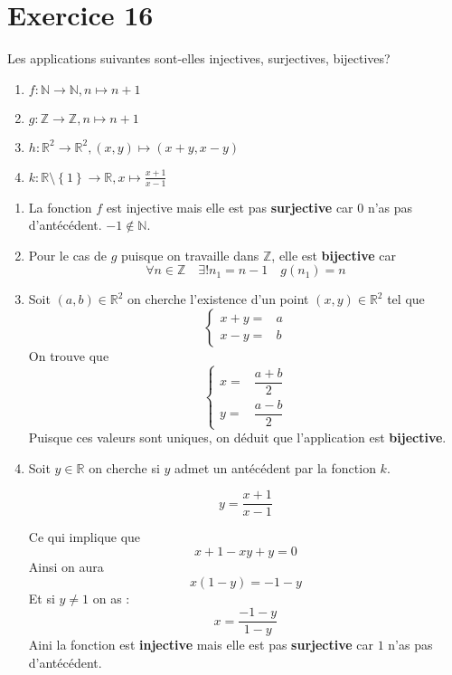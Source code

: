 \documentclass{report}
\begin{document}
\section{Exercice 16}
\qs{}
{
Les applications suivantes sont-elles injectives, surjectives, bijectives?
\begin{enumerate}
  \item $f : {\mathbb{N}} \to {\mathbb{N}}, {n} \mapsto {n + 1}$
  \item $g : {\mathbb{Z}} \to {\mathbb{Z}}, {n}\mapsto{n + 1}$
  \item $h : {\mathbb{R}^2} \to {\mathbb{R}^2}, {(x, y)}\mapsto{ (x + y, x-y)}$
  \item $k : {\mathbb{R} \setminus \left\{ 1\right\}} \to {\mathbb{R}}, {x}\mapsto{\frac{x + 1}{x - 1}}$
\end{enumerate}
}
\begin{myproof}

\begin{enumerate}
  \item  La fonction $f$ est injective mais elle est pas \textbf{surjective} car
    $0$ n'as pas d'antécédent. $-1\not\in \mathbb{N}$.\\
  \item Pour le cas de $g$ puisque on travaille dans $\mathbb{Z}$, elle est
    \textbf{bijective} car
    $$
    \forall n \in \mathbb{Z}\quad \exists! n_1= n-1 \quad g(n_1) = n
    $$
  \item Soit $(a,b)\in \mathbb{R}^2$ on cherche l'existence d'un point $(x,y)\in
    \mathbb{R}^2$ tel que 
    $$
    \begin{cases}
      x + y  = & a\\
      x - y  = & b
    \end{cases}
    $$
    On trouve que 
    $$
   \begin{cases}
     x = &\dfrac{a + b}{2} \\[3pt]
     y = & \dfrac{a - b }{2}
   \end{cases}
    $$
    Puisque ces valeurs sont uniques, on déduit que l'application est \textbf{bijective}.
  \item Soit $y \in \mathbb{R}$ on cherche si $y$ admet un antécédent par la
  fonction $k$. 

  \begin{equation*}
    y = \dfrac{x+1}{x-1} 
  \end{equation*}

  Ce qui implique que 
  $$
  x + 1 -xy + y = 0
  $$
  Ainsi on aura 
  $$
  x(1-y)  = -1 -y
  $$
  Et si $y\not=1$ on as :
  $$
  x = \dfrac{-1- y}{1-y}
  $$
  Aini la fonction est \textbf{injective} mais elle est pas \textbf{surjective}
  car $1$ n'as pas d'antécédent.
\end{enumerate}
  
\end{myproof}
\end{document}
